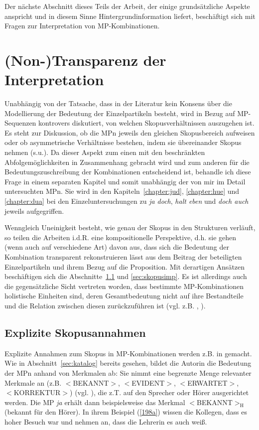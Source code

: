 Der nächste Abschnitt dieses Teils der Arbeit, der einige grundsätzliche Aspekte anspricht und in diesem Sinne Hintergrundinformation liefert, beschäftigt sich mit Fragen zur Interpretation von MP-Kombinationen.

\section{(Non-)Transparenz der Interpretation}
\label{sec:transparenz}
\setcounter{equation}{0}
Unabhängig von der Tatsache, dass in der Literatur kein Konsens über die Modellierung der Bedeutung der Einzelpartikeln besteht, wird in Bezug auf MP-Sequen\-zen kontrovers diskutiert, von welchen Skopusverhältnissen  auszugehen ist. Es steht zur Diskussion, ob die MPn jeweils den gleichen Skopusbereich aufweisen oder ob asymmetrische Verhältnisse bestehen, indem sie übereinander Skopus nehmen (s.u.). Da dieser Aspekt zum einen mit den beschränkten Abfolgemög\-lichkeiten in Zusammenhang gebracht wird und zum anderen für die Bedeutungszuschreibung der Kombinationen entscheidend ist, behandle ich diese Frage in einem se\-paraten Kapitel und somit unabhängig der von mir im Detail untersuchten MPn. Sie wird in den Kapiteln~\ref{chapter:jud}, \ref{chapter:hue} und \ref{chapter:dua} bei den Einzeluntersuchungen zu \textit{ja doch}, \textit{halt eben} und \textit{doch auch} jeweils aufgegriffen. 

Wenngleich Uneinigkeit besteht, wie genau der Skopus in den Strukturen verläuft, so teilen die Arbeiten i.d.R. eine kompositionelle Perspektive, d.h. sie gehen (wenn auch auf verschiedene Art) davon aus, dass sich die Bedeutung der Kombination transparent rekonstruieren lässt aus dem Beitrag der beteiligten Einzelpartikeln und ihrem Bezug auf die Proposition. Mit derartigen Ansätzen beschäftigen sich die Abschnitte~\ref{sec:skopusexp} und \ref{sec:skopusimp}. Es ist allerdings auch die gegensätzliche Sicht vertreten worden, dass bestimmte MP-Kombinationen holistische Einheiten sind, deren Gesamtbedeutung nicht auf ihre Bestandteile und die Relation zwi\-schen diesen zurückzuführen ist (vgl. z.B. \citealt[487]{Eroms2000}, \citealt{Lemnitzer2001}).

\subsection{Explizite Skopusannahmen}
\label{sec:skopusexp}
Explizite Annahmen zum Skopus in MP-Kombinationen werden z.B. in \citet{Thurmair1989, Thurmair1991} gemacht. Wie in Abschnitt~\ref{sec:katalog} bereits gesehen, bildet die Autorin die Bedeutung der MPn anhand von Merkmalen  ab: Sie nimmt eine begrenzte Menge relevanter Merkmale an (z.B. $<$BEKANNT$>$, $<$EVIDENT$>$, $<$ERWARTET$>$, \\ $<$KORREKTUR$>$) (vgl. \citealt[100-101, 200]{Thurmair1989}), die z.T. auf den Sprecher oder Hörer ausgerichtet werden. Die MP \textit{ja} erhält dann beispiels\-weise das Merkmal $<$BEKANNT$>_{\textrm{H}}$ (\glq bekannt für den Hörer\grq {}). In ihrem Beispiel (\ref{198a}) wissen die Kollegen, dass es \glqq hoher Besuch\grqq{} war und nehmen an, dass die Lehrerin es auch weiß.


